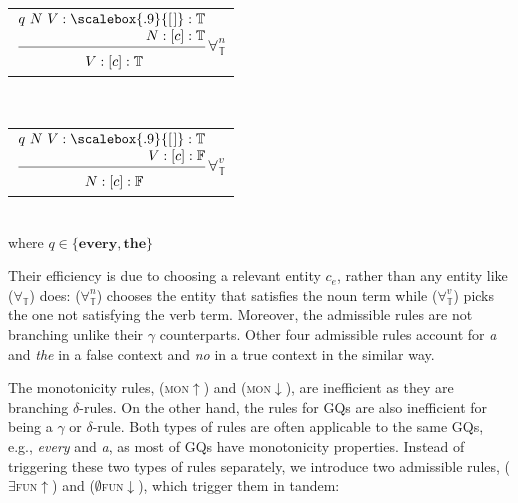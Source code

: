 \documentclass[11pt]{article}
\makeatletter
\newcommand{\elist}{\scalebox{.9}{[\kern1pt]}}
\newcommand{\rulen}[1]{{\normalfont\textsc{#1}}}
\newcommand{\synt}[1]{\textbf{#1}}
\newcommand{\X}{\mathbb{X}}
\newcommand{\T}{\mathbb{T}}
\newcommand{\F}{\mathbb{F}}
\newcommand{\nonBranchingRule}[3][]{
\begin{tabular}{@{}c@{}}
$\dfrac{
	\begin{tabular}{@{}r@{}}
			#2
	\end{tabular}}
{
	\raisebox{-4pt}{
		\begin{tabular}[t]{@{}r@{}}
   			#3
	\end{tabular}}
}$#1
\end{tabular}}
\makeatother
\begin{document}
\begin{center}
\nonBranchingRule[$\forall^n_\T$]
{$q~N~V : \elist : \T$\\
 $N : [c] : \T$
}
{$V : [c] : \T$}
~
\nonBranchingRule[$\forall^v_\T$]
{$q~N~V : \elist : \T$\\
 $V : [c] : \F$
}
{$N : [c] : \F$}
\\
where $q \in \{\synt{every},\synt{the}\}$
\end{center}
%
Their efficiency is due to choosing a relevant entity $c_e$, rather than any entity like ($\forall_\T$) does: ($\forall^{n}_\T$) chooses the entity that satisfies the noun term while ($\forall^{v}_\T$) picks the one not satisfying the verb term. 
Moreover, the admissible rules are not branching unlike their $\gamma$ counterparts.
Other four admissible rules account for {\em a} and {\em the} in a false context and {\em no} in a true context in the similar way. 


The monotonicity rules, (\rulen{mon$\uparrow$}) and (\rulen{mon$\downarrow$}), are inefficient as they are branching $\delta$-rules.
On the other hand, the rules for GQs are also inefficient for being a $\gamma$ or $\delta$-rule.
Both types of rules are often applicable to the same GQs, e.g., {\em every} and {\em a}, as most of GQs have monotonicity properties.
Instead of triggering these two types of rules separately, we introduce two admissible rules, (\rulen{$\exists$fun$\uparrow$}) and (\rulen{$\emptyset$fun$\downarrow$}), which trigger them in tandem:%
%
\end{document}
